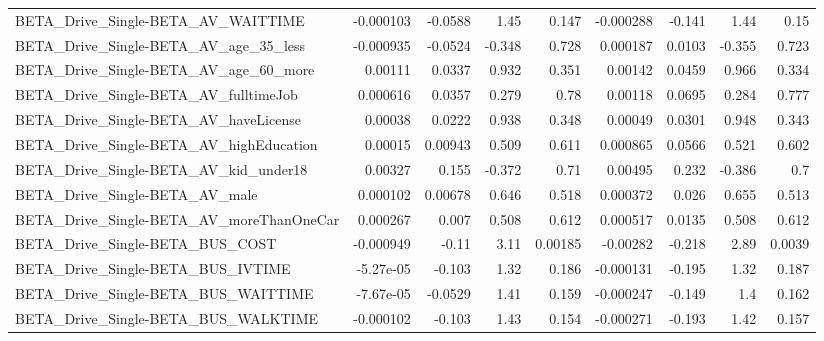 \begin{tabular}{lrrrrrrrr}
BETA\_Drive\_Single-BETA\_AV\_WAITTIME                 &   -0.000103 &      -0.0588 &     1.45 &    0.147 &  -0.000288 &      -0.141 &         1.44 &          0.15 \\
BETA\_Drive\_Single-BETA\_AV\_age\_35\_less              &   -0.000935 &      -0.0524 &   -0.348 &    0.728 &   0.000187 &      0.0103 &       -0.355 &         0.723 \\
BETA\_Drive\_Single-BETA\_AV\_age\_60\_more              &     0.00111 &       0.0337 &    0.932 &    0.351 &    0.00142 &      0.0459 &        0.966 &         0.334 \\
BETA\_Drive\_Single-BETA\_AV\_fulltimeJob              &    0.000616 &       0.0357 &    0.279 &     0.78 &    0.00118 &      0.0695 &        0.284 &         0.777 \\
BETA\_Drive\_Single-BETA\_AV\_haveLicense              &     0.00038 &       0.0222 &    0.938 &    0.348 &    0.00049 &      0.0301 &        0.948 &         0.343 \\
BETA\_Drive\_Single-BETA\_AV\_highEducation            &     0.00015 &      0.00943 &    0.509 &    0.611 &   0.000865 &      0.0566 &        0.521 &         0.602 \\
BETA\_Drive\_Single-BETA\_AV\_kid\_under18              &     0.00327 &        0.155 &   -0.372 &     0.71 &    0.00495 &       0.232 &       -0.386 &           0.7 \\
BETA\_Drive\_Single-BETA\_AV\_male                     &    0.000102 &      0.00678 &    0.646 &    0.518 &   0.000372 &       0.026 &        0.655 &         0.513 \\
BETA\_Drive\_Single-BETA\_AV\_moreThanOneCar           &    0.000267 &        0.007 &    0.508 &    0.612 &   0.000517 &      0.0135 &        0.508 &         0.612 \\
BETA\_Drive\_Single-BETA\_BUS\_COST                    &   -0.000949 &        -0.11 &     3.11 &  0.00185 &   -0.00282 &      -0.218 &         2.89 &        0.0039 \\
BETA\_Drive\_Single-BETA\_BUS\_IVTIME                  &   -5.27e-05 &       -0.103 &     1.32 &    0.186 &  -0.000131 &      -0.195 &         1.32 &         0.187 \\
BETA\_Drive\_Single-BETA\_BUS\_WAITTIME                &   -7.67e-05 &      -0.0529 &     1.41 &    0.159 &  -0.000247 &      -0.149 &          1.4 &         0.162 \\
BETA\_Drive\_Single-BETA\_BUS\_WALKTIME                &   -0.000102 &       -0.103 &     1.43 &    0.154 &  -0.000271 &      -0.193 &         1.42 &         0.157 \\

\end{tabular}
